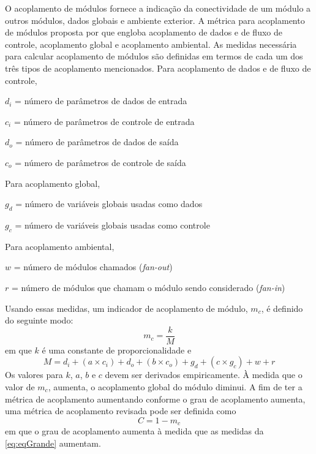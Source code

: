 O acoplamento de módulos fornece a indicação da conectividade de um módulo a outros módulos, dados globais e ambiente exterior.
A métrica para acoplamento de módulos proposta por  que engloba acoplamento de dados e de fluxo de controle, acoplamento global e acoplamento ambiental. As medidas necessária para calcular acoplamento de módulos são definidas em termos de cada um dos três tipos de acoplamento mencionados.
Para acoplamento de dados e de fluxo de controle,
\begin{description}
	\item$d_i$ = número de parâmetros de dados de entrada
	\item$c_i$ = número de parâmetros de controle de entrada
	\item$d_o$ = número de parâmetros de dados de saída
	\item$c_o$ = número de parâmetros de controle de saída
\end{description}
Para acoplamento global,
\begin{description}
	\item$g_d$ = número de variáveis globais usadas como dados
	\item$g_c$ = número de variáveis globais usadas como controle
\end{description}
Para acoplamento ambiental,
\begin{description}
	\item$w$ = número de módulos chamados (\textit{fan-out})
	\item$r$ = número de módulos que chamam o módulo sendo considerado (\textit{fan-in})
\end{description}

Usando essas medidas, um indicador de acoplamento de módulo, $m_c$, é definido do seguinte modo:
\begin{equation}
	m_c = \frac{k}{M}
\end{equation}
em que $k$ é uma constante de proporcionalidade e
\begin{equation}
\label{eq:eqGrande}
	M = d_i + (a \times c_i) + d_o + (b \times c_o) + g_d + (c \times g_c) + w + r
\end{equation}
Os valores para $k$, $a$, $b$ e $c$ devem ser derivados empiricamente.
À medida que o valor de $m_c$, aumenta, o acoplamento global do módulo diminui. A fim de ter a métrica de acoplamento aumentando conforme o grau de acoplamento aumenta, uma métrica de acoplamento revisada pode ser definida como
\begin{equation}
	C = 1 - m_c
\end{equation}
em que o grau de acoplamento aumenta à medida que as medidas da \autoref{eq:eqGrande} aumentam.

